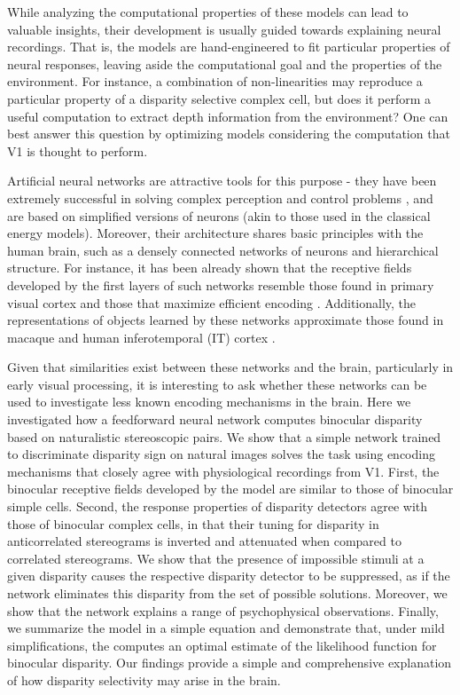 While analyzing the computational properties of these models can lead to valuable insights, their development is usually guided towards explaining neural recordings. That is, the models are hand-engineered to fit particular properties of neural responses, leaving aside the computational goal and the properties of the environment. For instance, a combination of non-linearities may reproduce a particular property of a disparity selective complex cell, but does it perform a useful computation to extract depth information from the environment? One can best answer this question by optimizing models considering the computation that V1 is thought to perform.    

Artificial neural networks are attractive tools for this purpose - they have been extremely successful in solving complex perception and control problems \cite{NIPS2012_4824,Mnih:2015fo}, and are based on simplified versions of neurons (akin to those used in the classical energy models). Moreover, their architecture shares basic principles with the human brain, such as a densely connected networks of neurons and hierarchical structure. For instance, it has been already shown that the receptive fields developed by the first layers of such networks resemble those found in primary visual cortex \cite{NIPS2012_4824} and those that maximize efficient encoding \cite{Olshausen:1996dt}. Additionally, the representations of objects learned by these networks approximate those found in macaque and human inferotemporal (IT) cortex \cite{Khaligh-Razavi:2014yr,Cadieu:2014fk,Yamins:2014tc,Yamins:2016bh}.

Given that similarities exist between these networks and the brain, particularly in early visual processing, it is interesting to ask whether these networks can be used to investigate less known encoding mechanisms in the brain. Here we investigated how a feedforward neural network computes binocular disparity based on naturalistic stereoscopic pairs. We show that a simple network trained to discriminate disparity sign on natural images solves the task using encoding mechanisms that closely agree with physiological recordings from V1. First, the binocular receptive fields developed by the model are similar to those of binocular simple cells. Second, the response properties of disparity detectors agree with those of binocular complex cells, in that their tuning for disparity in anticorrelated stereograms is inverted and attenuated when compared to correlated stereograms. We show that the presence of impossible stimuli at a given disparity causes the respective disparity detector to be suppressed, as if the network eliminates this disparity from the set of possible solutions. Moreover, we show that the network explains a range of psychophysical observations. Finally, we summarize the model in a simple equation and demonstrate that, under mild simplifications, the computes an optimal estimate of the likelihood function for binocular disparity. Our findings provide a simple and comprehensive explanation of how disparity selectivity may arise in the brain.

